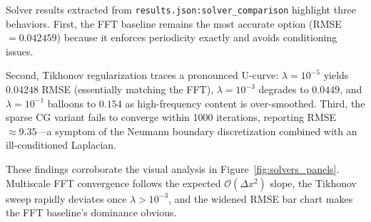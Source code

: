 \documentclass[11pt]{article}
\begin{document}
Solver results extracted from \texttt{results.json:solver\_comparison} highlight three behaviors. First, the FFT baseline remains the most accurate option (RMSE $=0.042459$) because it enforces periodicity exactly and avoids conditioning issues.

Second, Tikhonov regularization traces a pronounced U-curve: $\lambda=10^{-5}$ yields $0.04248$ RMSE (essentially matching the FFT), $\lambda=10^{-3}$ degrades to $0.0449$, and $\lambda=10^{-1}$ balloons to $0.154$ as high-frequency content is over-smoothed. Third, the sparse CG variant fails to converge within 1000 iterations, reporting RMSE $\approx9.35$—a symptom of the Neumann boundary discretization combined with an ill-conditioned Laplacian.

These findings corroborate the visual analysis in Figure~\ref{fig:solvers_panels}. Multiscale FFT convergence follows the expected $\mathcal{O}(\Delta x^2)$ slope, the Tikhonov sweep rapidly deviates once $\lambda>10^{-3}$, and the widened RMSE bar chart makes the FFT baseline’s dominance obvious.

\newpage
\appendix
\end{document}
